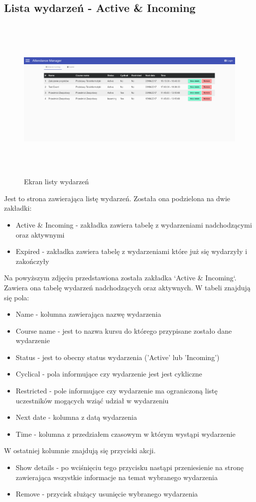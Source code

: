 \subsection{Lista wydarzeń - Active \& Incoming}
\begin{figure}[!h]
\centering
\includegraphics[height=8cm,width=15cm]{images/EventsListIncomingAndActive}
\caption{Ekran listy wydarzeń}
\label{fig:EventsListIncomingAndActive}
\end{figure}

Jest to strona zawierająca listę wydarzeń. Została ona podzielona na dwie zakładki:
\begin{itemize}
    \item Active & Incoming - zakładka zawiera tabelę z wydarzeniami nadchodzącymi oraz aktywnymi
    \item Expired - zakładka zawiera tabelę z wydarzeniami które już się wydarzyły i zakończyły
\end{itemize}
Na powyższym zdjęciu przedstawiona została zakładka `Active & Incoming`. Zawiera ona tabelę wydarzeń nadchodzących oraz aktywnych. W tabeli znajdują się pola:
\begin{itemize}
    \item Name - kolumna zawierająca nazwę wydarzenia
    \item Course name - jest to nazwa kursu do którego przypisane zostało dane wydarzenie
    \item Status - jest to obecny status wydarzenia ('Active' lub 'Incoming')
    \item Cyclical - pola informujące czy wydarzenie jest jest cykliczne
    \item Restricted - pole informujące czy wydarzenie ma ograniczoną listę uczestników mogących wziąć udział w wydarzeniu
    \item Next date - kolumna z datą wydarzenia
    \item Time - kolumna z przedziałem czasowym w którym wystąpi wydarzenie
\end{itemize}
W ostatniej kolumnie znajdują się przyciski akcji.
\begin{itemize}
    \item Show details - po wciśnięciu tego przycisku nastąpi przeniesienie na stronę zawierająca wszystkie informacje na temat wybranego wydarzenia
    \item Remove - przycisk służący usunięcie wybranego wydarzenia
\end{itemize}

